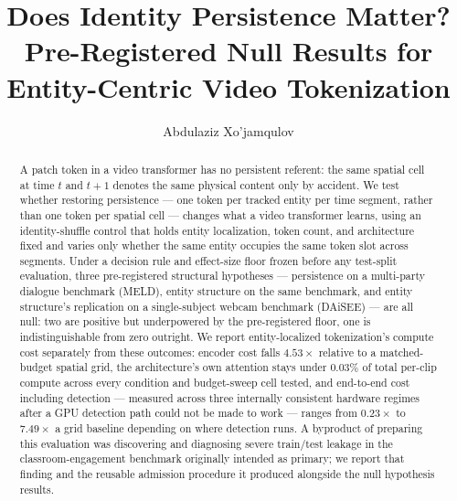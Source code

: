\documentclass[sigconf]{acmart}
\begin{document}
\title{Does Identity Persistence Matter? Pre-Registered Null Results for
  Entity-Centric Video Tokenization}

\author{Abdulaziz Xo'jamqulov}
\email{}


\begin{abstract}
A patch token in a video transformer has no persistent referent: the same
spatial cell at time $t$ and $t{+}1$ denotes the same physical content only
by accident. We test whether restoring persistence --- one token per tracked
entity per time segment, rather than one token per spatial cell --- changes
what a video transformer learns, using an identity-shuffle control that
holds entity localization, token count, and architecture fixed and varies
only whether the same entity occupies the same token slot across segments.
Under a decision rule and effect-size floor frozen before any test-split
evaluation, three pre-registered structural hypotheses --- persistence on a
multi-party dialogue benchmark (MELD), entity structure on the same
benchmark, and entity structure's replication on a single-subject webcam
benchmark (DAiSEE) --- are all null: two are positive but underpowered by
the pre-registered floor, one is indistinguishable from zero outright. We
report entity-localized tokenization's compute cost separately from these
outcomes: encoder cost falls $4.53\times$ relative to a matched-budget
spatial grid, the architecture's own attention stays under $0.03\%$ of total
per-clip compute across every condition and budget-sweep cell tested, and
end-to-end cost including detection --- measured
across three internally consistent hardware regimes after a GPU detection
path could not be made to work --- ranges from $0.23\times$ to $7.49\times$
a grid baseline depending on where detection runs. A byproduct of preparing
this evaluation was discovering and diagnosing severe train/test leakage in
the classroom-engagement benchmark originally intended as primary; we report
that finding and the reusable admission procedure it produced alongside the
null hypothesis results.
\end{abstract}
\end{document}
